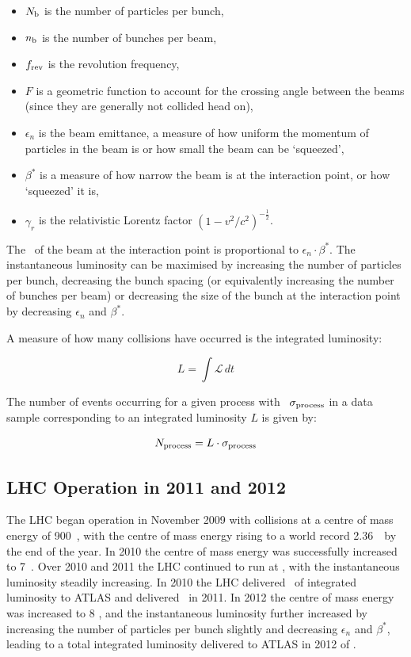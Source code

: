 \begin{itemize}
    \item $N_{\rm{b}}$ is the number of particles per bunch,
    \item $n_{\rm{b}}$ is the number of bunches per beam, 
    \item $f_{\rm{rev}}$ is the revolution frequency, 
    \item $F$ is a geometric function to account for the crossing angle between the beams (since
they are generally not collided head on), 
    \item $\epsilon_{n}$ is the beam emittance,
a measure of how uniform the momentum of particles in the beam is or how small
the beam can be `squeezed',
    \item $\beta^{*}$ is a measure of how narrow the beam is at the interaction
    point, or how `squeezed' it is,
    \item $\gamma_{r}$ is the relativistic Lorentz factor $(1 -
    v^2/c^2)^{-\frac{1}{2}}$.
\end{itemize}
    
The \cx\ of the beam at
the interaction point is proportional to ${\epsilon_{n} \cdot \beta^{*}}$.
The instantaneous luminosity can be maximised by increasing the
number of particles per bunch, decreasing the bunch spacing (or equivalently
increasing the number of bunches per beam) or decreasing the size of the bunch
at the interaction point by decreasing $\epsilon_{n}$ and $\beta^{*}$.

A measure of how many collisions have occurred is the integrated luminosity:

\begin{equation}
L = \int \mathcal{L} \, dt
\end{equation}

The number of events occurring for a given process with \cx\
$\sigma_{\rm{process}}$ in a data sample corresponding to an integrated
luminosity $L$ is given by:

\begin{equation}
N_{\rm{process}} = L \cdot \sigma_{\rm{process}}
\end{equation}

\subsection{LHC Operation in 2011 and 2012}
\label{sec-lhc-operation}

The LHC began operation in November 2009 with collisions at a centre of mass
energy of 900~\GeV, with the centre of mass energy rising to a world record
2.36~\TeV\ by the end of the year. In 2010 the centre of mass energy was
successfully increased to 7~\TeV. Over 2010 and 2011 the LHC continued to run at
\sqrts{7}, with the instantaneous luminosity steadily increasing. In 2010 the
LHC delivered \LumiTotalDeliveredTwentyTen\ of integrated luminosity to ATLAS
and delivered \LumiTotalDeliveredTwentyEleven\ in 2011. In 2012 the centre of mass energy was
increased to 8 \tev, and the instantaneous luminosity further increased by
increasing the number of particles per bunch slightly and decreasing
$\epsilon_{n}$ and $\beta^{*}$, leading to a total integrated luminosity
delivered to ATLAS in 2012 of \LumiTotalDeliveredTwentyTwelve. 

